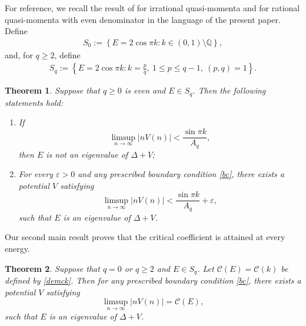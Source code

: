 \documentclass[12pt]{amsart}
\theoremstyle{plain}
\newtheorem{theorem}{Theorem}[section]
\theoremstyle{definition}
\begin{document}
For reference, we recall the result of \cite{LiuDiscrete} for
irrational quasi-momenta and for rational quasi-momenta with even
denominator  in the language of the present paper. Define
\begin{align}
	S_0:=
	\left\{
	E=2\cos\pi k:
	k\in(0,1)\setminus\mathbb Q
	\right\},
	\nonumber
\end{align}
and, for $q\geq2$, define
\begin{align}
	S_q:=
	\left\{
	E=2\cos\pi k:
	k=\frac pq,\ 
	1\leq p\leq q-1,\ 
	(p,q)=1
	\right\}.
	\nonumber
\end{align}
\begin{theorem}\cite{LiuDiscrete}\label{ccdd}
	Suppose that $q\geq 0$ is even and $E\in S_q$. Then the following statements hold:
	\begin{enumerate}
		\item[(i)] If
		\[
		\limsup_{n\to\infty}|nV(n)|
		<
		\frac{\sin\pi k}{A_q},
		\]
		then $E$ is not an eigenvalue of $\Delta+V$;
		
		\item[(ii)]  For every $\varepsilon>0$ and any  prescribed boundary condition
		\eqref{bc}, there exists a potential $V$ satisfying
		\[
		\limsup_{n\to\infty}|nV(n)|
		<
		\frac{\sin\pi k}{A_q}+\varepsilon,
		\]
		such that $E$ is an eigenvalue of $\Delta+V$.
	\end{enumerate}
\end{theorem}

Our second main result proves that the critical coefficient is attained
at every energy.

\begin{theorem}\label{main2}
	Suppose that $q=0$ or $q\geq 2$ and $E\in S_q$. Let $\mathcal{C}(E)=\mathcal{C}(k)$ be defined by \eqref{demck}.
	Then for any prescribed boundary condition
	\eqref{bc}, there exists a potential $V$ satisfying
	\[
	\limsup_{n\to\infty}|nV(n)|
	=\mathcal C(E),
	\]
	such that $E$ is an eigenvalue of $\Delta+V$.
	
\end{theorem}
\end{document}
